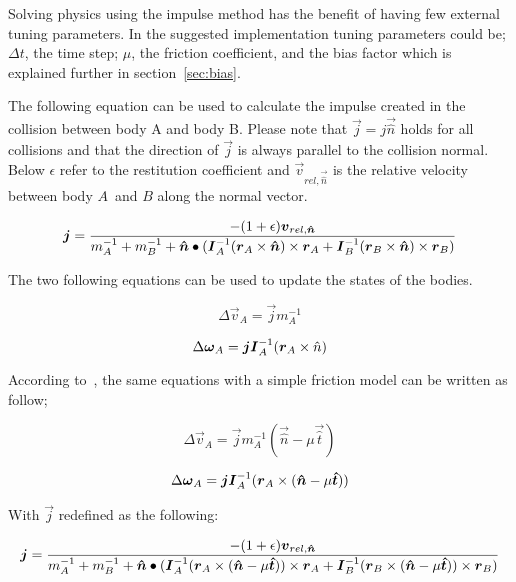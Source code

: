 Solving physics using the impulse method has the benefit of having few external tuning
parameters. In the suggested implementation tuning parameters could be; $\Delta t$, the time step;
$\mu$, the friction coefficient, and the bias factor which is explained further in section~\ref{sec:bias}.

The following equation can be used to calculate the impulse created in the
collision between body A and body B.
Please note that $\vec{j} = j\vec{\hat{n}}$ holds for all collisions and that the direction
of $\vec{j}$ is always parallel to the collision normal. Below $\epsilon$ refer to the
restitution coefficient and $\vec{v}_{rel,\vec{\hat{n}}}$ is the relative velocity
between body $A$ and $B$ along the normal vector.

\begin{equation}
  \boldsymbol{j} = \frac{-(1+\epsilon)\boldsymbol{v}_{rel,\boldsymbol{\hat{n}}}}
  {m_A^{-1}+m_B^{-1}+\boldsymbol{\hat{n}}\bullet(\boldsymbol{I}_A^{-1}(\boldsymbol{r}_A\times\boldsymbol{\hat{n}})\times\boldsymbol{r}_A
  +\boldsymbol{I}_B^{-1}(\boldsymbol{r}_B\times\boldsymbol{\hat{n}})\times\boldsymbol{r}_B)}
\end{equation}

The two following equations can be used to update the states of the bodies.

\begin{equation}
  \Delta\vec{v}_A = \vec{j}m_A^{-1}
\end{equation}

\begin{equation}
  \Delta\boldsymbol{\omega}_A = \boldsymbol{j}\boldsymbol{I}_A^{-1}(\boldsymbol{r}_A\times\hat{n})
\end{equation}

According to~\cite{hansson}, the same equations with a simple friction model can
be written as follow;

\begin{equation}
  \Delta\vec{v}_A = \vec{j}m_A^{-1}(\vec{\hat{n}} - \mu\vec{\hat{t}})
\end{equation}

\begin{equation}
  \Delta\boldsymbol{\omega}_A = \boldsymbol{j}\boldsymbol{I}_A^{-1}(\boldsymbol{r}_A\times(\boldsymbol{\hat{n}}-\mu\boldsymbol{\hat{t}}))
\end{equation}

With $\vec{j}$ redefined as the following:

\begin{equation}\label{eq:j}
  \boldsymbol{j} = \frac{-(1+\epsilon)\boldsymbol{v}_{rel,\boldsymbol{\hat{n}}}}
  {m_A^{-1}+m_B^{-1}+\boldsymbol{\hat{n}}\bullet(\boldsymbol{I}_A^{-1}(\boldsymbol{r}_A\times(\boldsymbol{\hat{n}}-\mu\boldsymbol{\hat{t}}))\times\boldsymbol{r}_A
  +\boldsymbol{I}_B^{-1}(\boldsymbol{r}_B\times(\boldsymbol{\hat{n}}-\mu\boldsymbol{\hat{t}}))\times\boldsymbol{r}_B)}
\end{equation}


